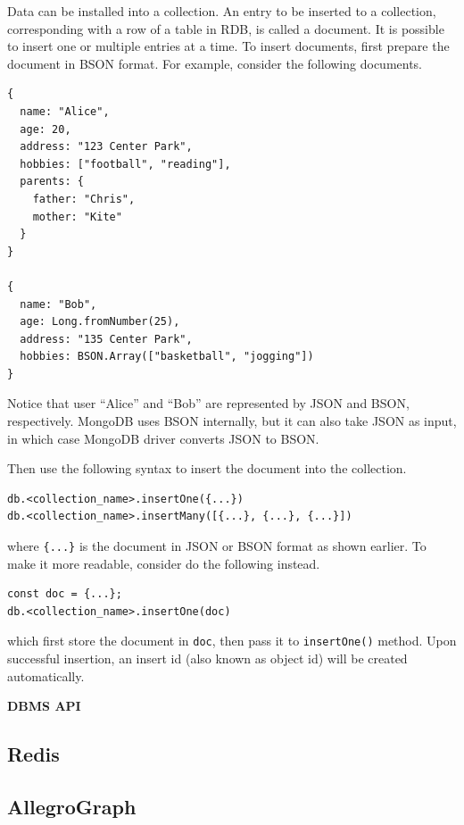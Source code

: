 Data can be installed into a collection. An entry to be inserted to a collection, corresponding with a row of a table in RDB, is called a document. It is possible to insert one or multiple entries at a time. To insert documents, first prepare the document in BSON format. For example, consider the following documents.
\begin{lstlisting}
{
  name: "Alice",
  age: 20,
  address: "123 Center Park",
  hobbies: ["football", "reading"],
  parents: {
    father: "Chris",
    mother: "Kite"
  }
}

{
  name: "Bob",
  age: Long.fromNumber(25),
  address: "135 Center Park",
  hobbies: BSON.Array(["basketball", "jogging"])
}
\end{lstlisting}
Notice that user ``Alice'' and ``Bob'' are represented by JSON and BSON, respectively. MongoDB uses BSON internally, but it can also take JSON as input, in which case MongoDB driver converts JSON to BSON.

Then use the following syntax to insert the document into the collection.
\begin{lstlisting}
db.<collection_name>.insertOne({...})
db.<collection_name>.insertMany([{...}, {...}, {...}])
\end{lstlisting}
where \verb|{...}| is the document in JSON or BSON format as shown earlier. To make it more readable, consider do the following instead.
\begin{lstlisting}
const doc = {...};
db.<collection_name>.insertOne(doc)
\end{lstlisting}
which first store the document in \verb|doc|, then pass it to \verb|insertOne()| method. Upon successful insertion, an insert id (also known as object id) will be created automatically.




\vspace{0.1in}
\noindent \textbf{DBMS API}
\vspace{0.1in}




\subsection{Redis}





\subsection{AllegroGraph}






